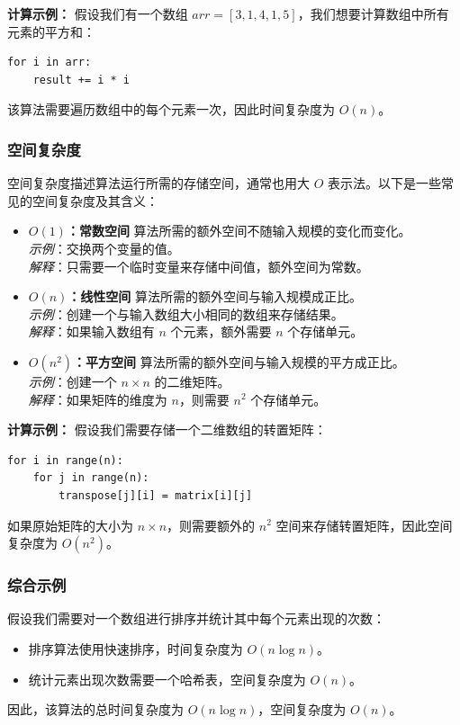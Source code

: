 \documentclass[lang=cn,newtx,10pt,scheme=chinese]{../elegantbook}
\begin{document}
\textbf{计算示例：}
假设我们有一个数组 $arr = [3, 1, 4, 1, 5]$，我们想要计算数组中所有元素的平方和：
\begin{verbatim}
for i in arr:
    result += i * i
\end{verbatim}
该算法需要遍历数组中的每个元素一次，因此时间复杂度为 $O(n)$。

\subsubsection{空间复杂度}
空间复杂度描述算法运行所需的存储空间，通常也用大 $O$ 表示法。以下是一些常见的空间复杂度及其含义：

\begin{itemize}
    \item \textbf{$O(1)$：常数空间}
    算法所需的额外空间不随输入规模的变化而变化。\\
    \textit{示例}：交换两个变量的值。\\
    \textit{解释}：只需要一个临时变量来存储中间值，额外空间为常数。

    \item \textbf{$O(n)$：线性空间}
    算法所需的额外空间与输入规模成正比。\\
    \textit{示例}：创建一个与输入数组大小相同的数组来存储结果。\\
    \textit{解释}：如果输入数组有 $n$ 个元素，额外需要 $n$ 个存储单元。

    \item \textbf{$O(n^2)$：平方空间}
    算法所需的额外空间与输入规模的平方成正比。\\
    \textit{示例}：创建一个 $n \times n$ 的二维矩阵。\\
    \textit{解释}：如果矩阵的维度为 $n$，则需要 $n^2$ 个存储单元。
\end{itemize}

\textbf{计算示例：}
假设我们需要存储一个二维数组的转置矩阵：
\begin{verbatim}
for i in range(n):
    for j in range(n):
        transpose[j][i] = matrix[i][j]
\end{verbatim}
如果原始矩阵的大小为 $n \times n$，则需要额外的 $n^2$ 空间来存储转置矩阵，因此空间复杂度为 $O(n^2)$。

\subsubsection{综合示例}
假设我们需要对一个数组进行排序并统计其中每个元素出现的次数：
\begin{itemize}
    \item 排序算法使用快速排序，时间复杂度为 $O(n \log n)$。
    \item 统计元素出现次数需要一个哈希表，空间复杂度为 $O(n)$。
\end{itemize}
因此，该算法的总时间复杂度为 $O(n \log n)$，空间复杂度为 $O(n)$。
\end{document}
